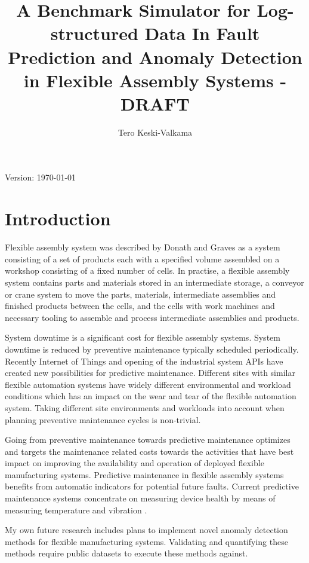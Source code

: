 \documentclass[journal]{IEEEtran}
\title{A Benchmark Simulator for Log-structured Data In Fault Prediction and Anomaly Detection in Flexible Assembly Systems - DRAFT}
\author{Tero Keski-Valkama}
\begin{document}
\maketitle
Version: \today

\begin{abstract}

\end{abstract}

\begin{IEEEkeywords}
\end{IEEEkeywords}

\section{Introduction}
Flexible assembly system was described by Donath and Graves \cite{donath1988flexible} as a system consisting of a set of products each with a specified volume
assembled on a workshop consisting of a fixed number of cells. In practise, a flexible assembly system contains parts and materials stored in an intermediate storage,
a conveyor or crane system to move the parts, materials, intermediate assemblies and finished products between the cells, and the cells with work machines and necessary tooling
to assemble and process intermediate assemblies and products.

System downtime is a significant cost for flexible assembly systems. System downtime is reduced by preventive maintenance typically scheduled periodically.
Recently Internet of Things and opening of the industrial system APIs have created new possibilities for predictive maintenance. Different sites with similar
flexible automation systems have widely different environmental and workload conditions which has an impact on the wear and tear of the flexible automation system.
Taking different site environments and workloads into account when planning preventive maintenance cycles is non-trivial.

Going from preventive maintenance towards predictive maintenance optimizes and targets the maintenance related costs towards the activities that have best impact
on improving the availability and operation of deployed flexible manufacturing systems.
Predictive maintenance in flexible assembly systems benefits from automatic indicators for potential future faults.
Current predictive maintenance systems concentrate on measuring device health by means of measuring temperature and vibration
\cite{contreras2002integrating}.

My own future research includes plans to implement novel anomaly detection methods for flexible manufacturing systems. Validating and quantifying these methods
require public datasets to execute these methods against.
\end{document}
